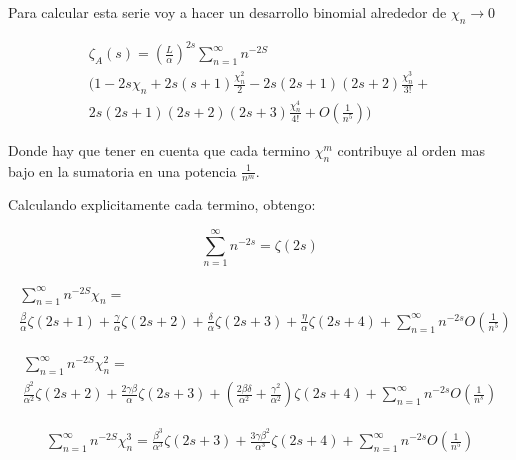 Para calcular esta serie voy a hacer un desarrollo binomial alrededor de $\chi _n \rightarrow{0} $ 

\begin{equation}
\begin{array}{c}
\zeta _{A} (s) = 
( \frac{L}{\alpha} ) ^{2s}
\sum _{n=1} ^{\infty}
  n  ^{-2 S} \\
(
1 - 2 s \chi _n + 2 s(s+1) \frac{\chi _n ^2}{2} - 2s(2s+1)(2s+2) \frac{ \chi _n ^3}{3!}  + \\ 
2s(2s+1)(2s+2)(2s+3) \frac{\chi ^4 _n}{4!}
+ O( \frac{1}{n ^5}) )

\end{array}
\end{equation}

Donde hay que tener en cuenta que cada termino $\chi _{n} ^{m} $ contribuye al orden mas bajo en la sumatoria en una potencia $\frac{1}{n ^m}$.


Calculando explicitamente cada termino, obtengo:

\begin{equation}
\sum _{n=1} ^{\infty} n ^{-2 s} = \zeta (2s)
\end{equation}


\begin{equation}
\begin{array}{c}
\begin{array}{c}
\sum _{n=1} ^{\infty}
 n  ^{-2 S}  \chi _n =  \\
\frac{\beta}{\alpha} \zeta (2s+1) + 
\frac{\gamma}{\alpha} \zeta(2s+2) + 
\frac{\delta}{\alpha} \zeta(2s+3) +
\frac{\eta}{\alpha} \zeta (2s+4) + 
\sum _{n=1} ^{\infty} n ^{-2s} O(\frac{1}{n ^5})
\end{array}
\end{array}
\end{equation}

\begin{equation}
\begin{array}{c}
    \sum _{n=1} ^{\infty}
    n   ^{-2 S} \chi _n ^2 = \\ 
    \frac{\beta ^2}{\alpha ^2} \zeta(2s+2) +
    \frac{2 \gamma \beta }{\alpha} \zeta (2s+3) + 
    \left( \frac{2 \beta \delta}{\alpha ^2} + \frac{\gamma ^2}{\alpha ^2} \right) \zeta (2s+4) + 
    \sum _{n=1} ^{\infty} n ^{-2s} O( \frac{1}{n^s} )
\end{array}
\end{equation}

\begin{equation}
\begin{array}{cc}
    \sum _{n=1} ^{\infty} 
    n ^{-2 S} \chi _n ^3 =
    \frac{\beta ^3}{\alpha ^3} \zeta (2s+3) + 
    \frac{3 \gamma \beta ^2}{\alpha ^3} \zeta (2s+4)
    + \sum _{n=1} ^{\infty} n ^{-2s} O( \frac{1}{n ^5} )
    
\end{array}
\end{equation}

